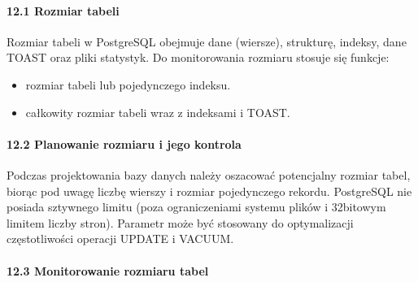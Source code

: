 \documentclass[letterpaper,10pt,polish]{sphinxmanual}
\begin{document}
\paragraph{12.1 Rozmiar tabeli}
\label{\detokenize{rozdzial2/Konfiguracja_baz_danych/Konfiguracja_baz_danych:rozmiar-tabeli}}
\sphinxAtStartPar
Rozmiar tabeli w PostgreSQL obejmuje dane (wiersze), strukturę, indeksy, dane TOAST oraz pliki statystyk. Do monitorowania rozmiaru stosuje się funkcje:
\begin{itemize}
\item {} 
\sphinxAtStartPar
{} \textendash{} rozmiar tabeli lub pojedynczego indeksu.

\item {} 
\sphinxAtStartPar
{} \textendash{} całkowity rozmiar tabeli wraz z indeksami i TOAST.

\end{itemize}


\paragraph{12.2 Planowanie rozmiaru i jego kontrola}
\label{\detokenize{rozdzial2/Konfiguracja_baz_danych/Konfiguracja_baz_danych:planowanie-rozmiaru-i-jego-kontrola}}
\sphinxAtStartPar
Podczas projektowania bazy danych należy oszacować potencjalny rozmiar tabel, biorąc pod uwagę liczbę wierszy i rozmiar pojedynczego rekordu. PostgreSQL nie posiada sztywnego limitu (poza ograniczeniami systemu plików i 32\sphinxhyphen{}bitowym limitem liczby stron). Parametr  może być stosowany do optymalizacji częstotliwości operacji UPDATE i VACUUM.


\paragraph{12.3 Monitorowanie rozmiaru tabel}
\label{\detokenize{rozdzial2/Konfiguracja_baz_danych/Konfiguracja_baz_danych:monitorowanie-rozmiaru-tabel}}
\sphinxAtStartPar
{}

\begin{sphinxVerbatim}[commandchars=\\\{\}]
 
\end{sphinxVerbatim}
\end{document}
